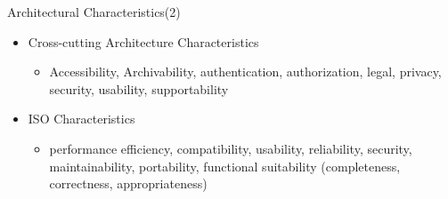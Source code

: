\documentclass[aspectratio=169, table]{beamer}
\begin{document}
	
	\begin{frame}{Architectural Characteristics(2)}
		\begin{itemize}
			
			\item Cross-cutting Architecture Characteristics
			\begin{itemize}
				\item Accessibility, Archivability, authentication, authorization, legal, privacy, security,
				usability, supportability
			\end{itemize}
			\item ISO Characteristics
			\begin{itemize}
				\item performance efficiency, compatibility, usability, reliability, security, maintainability, portability, functional suitability (completeness, correctness, appropriateness)
			\end{itemize}
		\end{itemize}
	\end{frame}
	
\end{document}
